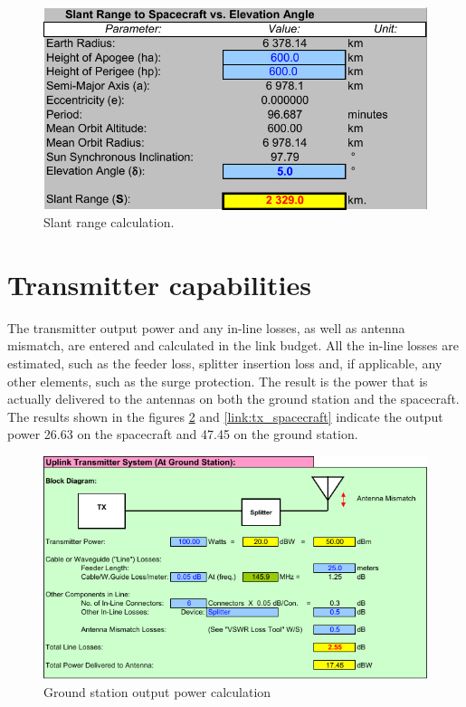 \begin{figure}
    \centering
    \includegraphics[width=0.8\paperwidth]{img/8/slant_range_calc.pdf}
    \caption{Slant range calculation.}
    \label{slant_range_calc}
\end{figure}

\section{Transmitter capabilities}
The transmitter output power and any in-line losses, as well as antenna mismatch,  are entered and calculated in the link budget. All the in-line losses are estimated, such as the feeder loss, splitter insertion loss and, if applicable, any other elements, such as the surge protection. The result is the power that is actually delivered to the antennas on both the ground station and the spacecraft. The results shown in the figures \ref{link:tx_gs} and \ref{link:tx_spacecraft} indicate the output power \SI{26.63}{\dBm} on the spacecraft and \SI{47.45}{\dBm} on the ground station.

\begin{figure}
    \centering
    \includegraphics[width=0.8\paperwidth]{img/8/tx_gs.pdf}
    \caption{Ground station output power calculation}
    \label{link:tx_gs}
\end{figure}

